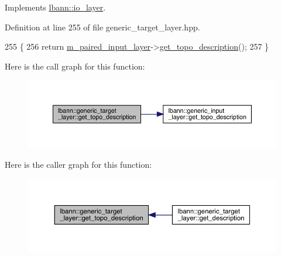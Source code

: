 Implements \hyperlink{classlbann_1_1io__layer_a955ab7100591d07d0758e8f95c6e50be}{lbann\+::io\+\_\+layer}.



Definition at line 255 of file generic\+\_\+target\+\_\+layer.\+hpp.


\begin{DoxyCode}
255                                                   \{
256     \textcolor{keywordflow}{return} \hyperlink{classlbann_1_1generic__target__layer_a84da1260e9feb4fbc3e6f2315e4cab4b}{m\_paired\_input\_layer}->\hyperlink{classlbann_1_1generic__input__layer_a36d9962105ca89889e3f38f1c1801560}{get\_topo\_description}();
257   \}
\end{DoxyCode}
Here is the call graph for this function\+:\nopagebreak
\begin{figure}[H]
\begin{center}
\leavevmode
\includegraphics[width=350pt]{classlbann_1_1generic__target__layer_ad6ea9a43254664c75aa06e8e5c1d7e8c_cgraph}
\end{center}
\end{figure}
Here is the caller graph for this function\+:\nopagebreak
\begin{figure}[H]
\begin{center}
\leavevmode
\includegraphics[width=350pt]{classlbann_1_1generic__target__layer_ad6ea9a43254664c75aa06e8e5c1d7e8c_icgraph}
\end{center}
\end{figure}
\mbox{\label{classlbann_1_1generic__target__layer_af41c92981e0a1731d3dee9b1b49201db}} 
